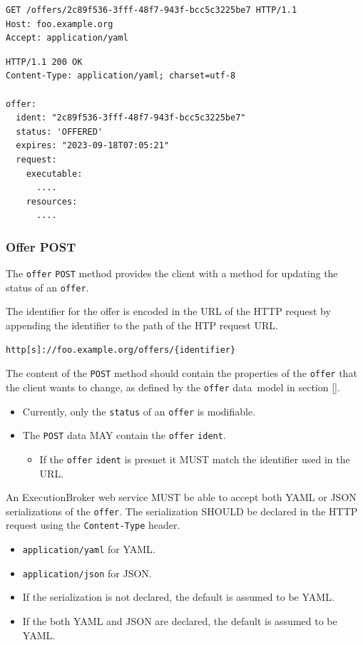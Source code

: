 \documentclass[11pt,a4paper]{ivoa}
\newcommand{\json} {JSON}
\newcommand{\yaml} {YAML}
\newcommand{\datamodel} {data~model}
\newcommand{\webservice} {web service}
\newcommand{\execbrokerclass} {ExecutionBroker}
\newcommand{\codeword}[1] {\texttt{#1}}
\begin{document}
\begin{lstlisting}[]
GET /offers/2c89f536-3fff-48f7-943f-bcc5c3225be7 HTTP/1.1
Host: foo.example.org
Accept: application/yaml
\end{lstlisting}

\begin{lstlisting}[]
HTTP/1.1 200 OK
Content-Type: application/yaml; charset=utf-8

offer:
  ident: "2c89f536-3fff-48f7-943f-bcc5c3225be7"
  status: 'OFFERED'
  expires: "2023-09-18T07:05:21"
  request:
    executable:
      ....
    resources:
      ....
\end{lstlisting}

\subsubsection{Offer POST}
\label{execution-planner-offer-post}

The \codeword{offer} \codeword{POST} method provides the client with a method for
updating the status of an \codeword{offer}.

The identifier for the offer is encoded in the URL of the HTTP request by appending the
identifier to the path of the HTP request URL.

\begin{lstlisting}[]
http[s]://foo.example.org/offers/{identifier}
\end{lstlisting}

The content of the \codeword{POST} method should contain the properties
of the \codeword{offer} that the client wants to change, as defined by
the \codeword{offer} \datamodel{} in section \ref{}.
\begin{itemize}
    \item Currently, only the \codeword{status} of an \codeword{offer} is modifiable.
    \item The \codeword{POST} data MAY contain the \codeword{offer} \codeword{ident}.
    \begin{itemize}
        \item If the \codeword{offer} \codeword{ident} is presnet it MUST match the identifier used in the URL.
    \end{itemize}
\end{itemize}

An \execbrokerclass{} \webservice{} MUST be able to accept both \yaml{} or \json{} serializations
of the \codeword{offer}.
The serialization SHOULD be declared in the HTTP request using the \codeword{Content-Type} header.
\begin{itemize}
    \item \codeword{application/yaml} for \yaml{}.
    \item \codeword{application/json} for \json{}.
    \item If the serialization is not declared, the default is assumed to be \yaml{}.
    \item If the both \yaml{} and \json{} are declared, the default is assumed to be \yaml{}.
\end{itemize}
\end{document}
